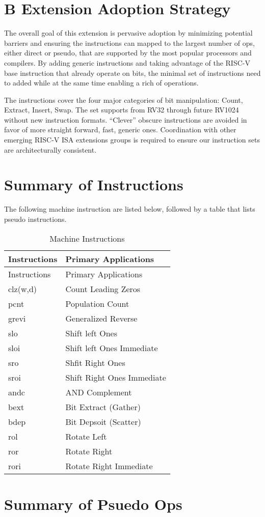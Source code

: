 \section{B Extension Adoption Strategy}

The overall goal of this extension is pervasive adoption by minimizing
potential barriers and ensuring the instructions can mapped to the
largest number of ops, either direct or pseudo, that are supported by
the most popular processors and compilers. By adding generic
instructions and taking advantage of the RISC-V base instruction that
already operate on bits, the minimal set of instructions need to added
while at the same time enabling a rich of operations.

The instructions cover the four major categories of bit manipulation:
Count, Extract, Insert, Swap. The set supports from RV32 through future
RV1024 without new instruction formats. ``Clever'' obscure instructions
are avoided in favor of more straight forward, fast, generic ones.
Coordination with other emerging RISC-V ISA extensions groups is
required to ensure our instruction sets are architecturally consistent.

\section{Summary of Instructions}

The following machine instruction are listed below, followed by a table
that lists pseudo instructions.

\begin{longtable}[c]{@{}ll@{}}
\caption{Machine Instructions}\tabularnewline
\toprule
Instructions & Primary Applications\tabularnewline
\midrule
\endfirsthead
\toprule
Instructions & Primary Applications\tabularnewline
\midrule
\endhead
clz(w,d) & Count Leading Zeros\tabularnewline
pcnt     & Population Count\tabularnewline
grevi    & Generalized Reverse\tabularnewline
slo      & Shift left Ones\tabularnewline
sloi     & Shift left Ones Immediate\tabularnewline
sro      & Shfit Right Ones\tabularnewline
sroi     & Shift Right Ones Immediate\tabularnewline
andc     & AND Complement\tabularnewline
bext     & Bit Extract (Gather)\tabularnewline
bdep     & Bit Depsoit (Scatter)\tabularnewline
rol      & Rotate Left\tabularnewline
ror      & Rotate Right\tabularnewline
rori     & Rotate Right Immediate\tabularnewline
\bottomrule
\end{longtable}

\section{Summary of Psuedo Ops}

